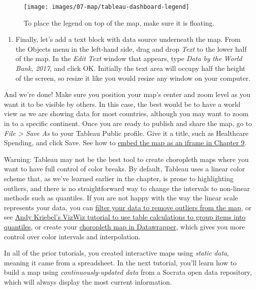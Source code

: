 \documentclass[
  english,
]{book}
\providecommand{\tightlist}{%
  \setlength{\itemsep}{0pt}\setlength{\parskip}{0pt}}
\begin{document}
\begin{figure}
\texttt{[image: images/07-map/tableau-dashboard-legend]} \caption{To place the legend on top of the map, make sure it is floating.}\label{fig:tableau-dashboard-legend}
\end{figure}

\begin{enumerate}
\def\labelenumi{\arabic{enumi}.}
\setcounter{enumi}{12}
\tightlist
\item
  Finally, let's add a text block with data source underneath the map. From the Objects menu in the left-hand side, drag and drop \emph{Text} to the lower half of the map. In the \emph{Edit Text} window that appears, type \emph{Data by the World Bank, 2017}, and click OK. Initially the text area will occupy half the height of the screen, so resize it like you would resize any window on your computer.
\end{enumerate}

And we're done! Make sure you position your map's center and zoom level as you want it to be visible by others. In this case, the best would be to have a world view as we are showing data for most countries, although you may want to zoom in to a specific continent. Once you are ready to publish and share the map, go to \emph{File \textgreater{} Save As} to your Tableau Public profile. Give it a title, such as Healthcare Spending, and click Save. See how to \href{embed-code.html}{embed the map as an iframe in Chapter 9}.

Warning: Tableau may not be the best tool to create choropleth maps where you want to have full control of color breaks. By default, Tableau uses a linear color scheme that, as we've learned earlier in the chapter, is prone to highlighting outliers, and there is no straightforward way to change the intervals to non-linear methods such as quantiles. If you are not happy with the way the linear scale represents your data, you can \href{https://help.tableau.com/current/pro/desktop/en-us/filtering.htm}{filter your data to remove outliers from the map}, or see \href{https://www.vizwiz.com/2018/07/rankpercentile.html}{Andy Kriebel's VizWiz tutorial to use table calculations to group items into quantiles}, or create your \href{choropleth-datawrapper.html}{choropleth map in Datawrapper}, which gives you more control over color intervals and interpolation.

In all of the prior tutorials, you created interactive maps using \emph{static data}, meaning it came from a spreadsheet. In the next tutorial, you'll learn how to build a map using \emph{continuously-updated data} from a Socrata open data repository, which will always display the most current information.
\end{document}

